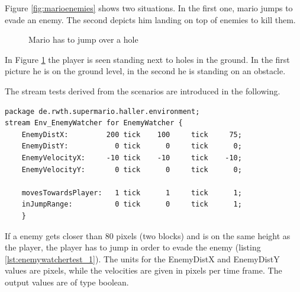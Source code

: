 Figure \ref{fig:marioenemies} shows two situations. In the first one, mario jumps to evade an enemy. The second depicts him landing on top of enemies to kill them.

\begin{figure} 
	\centering
	\caption{Mario has to jump over a hole} 
	\label{fig:mariohole}
\end{figure} 
In Figure \ref{fig:mariohole} the player is seen standing next to holes in the ground. In the first picture he is on the ground level, in the second he is standing on an obstacle.

The stream tests derived from the scenarios are introduced in the following.
\begin{lstlisting}[label=lst:enemywatchertest_1, caption=Enemy watcher stream test, morekeywords={package, stream, tick, for},
frame=single, basicstyle=\tiny]
package de.rwth.supermario.haller.environment;
stream Env_EnemyWatcher for EnemyWatcher {
    EnemyDistX:         200 tick    100     tick     75;
    EnemyDistY:           0 tick      0     tick      0;
    EnemyVelocityX:     -10 tick    -10     tick    -10;
    EnemyVelocityY:       0 tick      0     tick      0;
            
    movesTowardsPlayer:   1 tick      1     tick      1;
    inJumpRange:          0 tick      0     tick      1;
    }
\end{lstlisting}
If a enemy gets closer than 80 pixels (two blocks) and is on the same height as the player, the player has to jump in order to evade the enemy (listing \ref{lst:enemywatchertest_1}). The units for the EnemyDistX and EnemyDistY values are pixels, while the velocities are given in pixels per time frame.
The output values are of type boolean.


